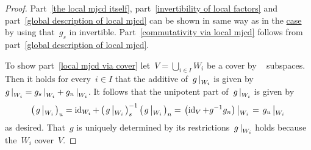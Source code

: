 \begin{proof}
  Part~\ref*{the local mjcd itself}, part~\ref*{invertibility of local factors} and part~\ref*{global description of local mjcd} can be shown in same way as in the \hyperref[mjcd]{{\fd} case} by using that~$g_s$ in invertible.
  Part~\ref*{commutativity via local mjcd} follows from part~\ref*{global description of local mjcd}.
  
  To show part~\ref*{local mjcd via cover} let~$V = \bigcup_{i \in I} W_i$ be a cover by {\fd}~ subspaces.
  Then it holds for every~$i \in I$ that the additive {\JCD} of~$\restrict{g}{W_i}$ is given by~$\restrict{g}{W_i} = \restrict{g_s}{W_i} + \restrict{g_n}{W_i}$.
  It follows that the unipotent part of~$\restrict{g}{W_i}$ is given by
  \[
      \left( \restrict*{g}{W_i} \right)_u
    =   \id_{W_i}
      + \left( \restrict*{g}{W_i} \right)_s^{-1}
        \left( \restrict*{g}{W_i} \right)_n
    = \restrict*{ \left( \id_V + g^{-1} g_n \right) }{W_i}
    = \restrict*{ g_u }{W_i}
  \]
  as desired.
  That~$g$ is uniquely determined by its restrictions~$\restrict{g}{W_i}$ holds because the~$W_i$ cover~$V$.
\end{proof}


